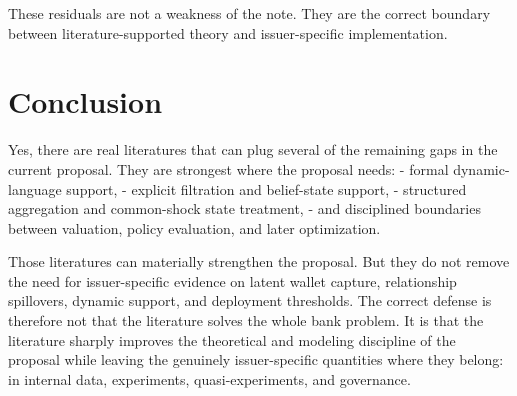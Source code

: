 \documentclass[11pt]{article}
\begin{document}
These residuals are not a weakness of the note. They are the correct boundary
between literature-supported theory and issuer-specific implementation.

\section{Conclusion}

Yes, there are real literatures that can plug several of the remaining gaps in
the current proposal. They are strongest where the proposal needs:
- formal dynamic-language support,
- explicit filtration and belief-state support,
- structured aggregation and common-shock state treatment,
- and disciplined boundaries between valuation, policy evaluation, and later
  optimization.

Those literatures can materially strengthen the proposal. But they do not remove
the need for issuer-specific evidence on latent wallet capture, relationship
spillovers, dynamic support, and deployment thresholds. The correct defense is
therefore not that the literature solves the whole bank problem. It is that the
literature sharply improves the theoretical and modeling discipline of the
proposal while leaving the genuinely issuer-specific quantities where they
belong: in internal data, experiments, quasi-experiments, and governance.



\end{document}

